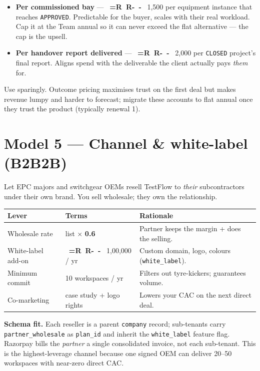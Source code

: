 \documentclass[11pt,a4paper]{article}
\newcommand{\Rs}{%
  \mbox{%
    \sffamily\bfseries
    \setbox0=\hbox{R}%
    R\kern-\wd0
    \raisebox{0.42em}{\rule{0.55em}{0.07em}}%
    \kern-\wd0
    \raisebox{0.25em}{\rule{0.55em}{0.07em}}%
    \kern\wd0
  }%
}
\newcommand{\plan}[1]{\texttt{\textcolor{accent}{#1}}}
\newcommand{\flag}[1]{\texttt{#1}}
\begin{document}
\begin{itemize}[noitemsep, leftmargin=1.4em]
  \item \textbf{Per commissioned bay} --- \Rs 1{,}500 per equipment instance that
        reaches \texttt{APPROVED}. Predictable for the buyer, scales with their
        real workload. Cap it at the Team annual so it can never exceed the flat
        alternative --- the cap is the upsell.
  \item \textbf{Per handover report delivered} --- \Rs 2{,}000 per
        \texttt{CLOSED} project's final report. Aligns spend with the deliverable
        the client actually pays \emph{them} for.
\end{itemize}

\noindent Use sparingly. Outcome pricing maximises trust on the first deal but
makes revenue lumpy and harder to forecast; migrate these accounts to flat annual
once they trust the product (typically renewal 1).

\section{Model 5 --- Channel \& white-label (B2B2B)}

Let EPC majors and switchgear OEMs resell TestFlow to \emph{their}
subcontractors under their own brand. You sell wholesale; they own the
relationship.

\begin{center}
\begin{tabular}{@{}L{4.3cm} L{4.0cm} L{6.0cm}@{}}
  \toprule
  \textbf{Lever} & \textbf{Terms} & \textbf{Rationale} \\
  \midrule
  Wholesale rate     & list $\times$ \textbf{0.6}  & Partner keeps the margin + does the selling. \\
  White-label add-on & \Rs 1{,}00{,}000 / yr        & Custom domain, logo, colours (\flag{white\_label}). \\
  Minimum commit     & 10 workspaces / yr          & Filters out tyre-kickers; guarantees volume. \\
  Co-marketing       & case study + logo rights    & Lowers your CAC on the next direct deal. \\
  \bottomrule
\end{tabular}
\end{center}

\noindent\textbf{Schema fit.} Each reseller is a parent \texttt{company} record;
sub-tenants carry \plan{partner\_wholesale} as \texttt{plan\_id} and inherit the
\flag{white\_label} feature flag. Razorpay bills the \emph{partner} a single
consolidated invoice, not each sub-tenant. This is the highest-leverage channel
because one signed OEM can deliver 20--50 workspaces with near-zero direct CAC.
\end{document}
